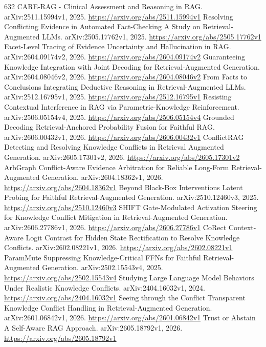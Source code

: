 \documentclass[11pt]{article}
\begin{document}
\begin{thebibliography}{632}
 CARE-RAG - Clinical Assessment and Reasoning in RAG. arXiv:2511.15994v1, 2025. \url{https://arxiv.org/abs/2511.15994v1}
 Resolving Conflicting Evidence in Automated Fact-Checking A Study on Retrieval-Augmented LLMs. arXiv:2505.17762v1, 2025. \url{https://arxiv.org/abs/2505.17762v1}
 Facet-Level Tracing of Evidence Uncertainty and Hallucination in RAG. arXiv:2604.09174v2, 2026. \url{https://arxiv.org/abs/2604.09174v2}
 Guaranteeing Knowledge Integration with Joint Decoding for Retrieval-Augmented Generation. arXiv:2604.08046v2, 2026. \url{https://arxiv.org/abs/2604.08046v2}
 From Facts to Conclusions Integrating Deductive Reasoning in Retrieval-Augmented LLMs. arXiv:2512.16795v1, 2025. \url{https://arxiv.org/abs/2512.16795v1}
 Resisting Contextual Interference in RAG via Parametric-Knowledge Reinforcement. arXiv:2506.05154v4, 2025. \url{https://arxiv.org/abs/2506.05154v4}
 Grounded Decoding Retrieval-Anchored Probability Fusion for Faithful RAG. arXiv:2606.00432v1, 2026. \url{https://arxiv.org/abs/2606.00432v1}
 ConflictRAG Detecting and Resolving Knowledge Conflicts in Retrieval Augmented Generation. arXiv:2605.17301v2, 2026. \url{https://arxiv.org/abs/2605.17301v2}
 ArbGraph Conflict-Aware Evidence Arbitration for Reliable Long-Form Retrieval-Augmented Generation. arXiv:2604.18362v1, 2026. \url{https://arxiv.org/abs/2604.18362v1}
 Beyond Black-Box Interventions Latent Probing for Faithful Retrieval-Augmented Generation. arXiv:2510.12460v3, 2025. \url{https://arxiv.org/abs/2510.12460v3}
 SHIFT Gate-Modulated Activation Steering for Knowledge Conflict Mitigation in Retrieval-Augmented Generation. arXiv:2606.27786v1, 2026. \url{https://arxiv.org/abs/2606.27786v1}
 CoRect Context-Aware Logit Contrast for Hidden State Rectification to Resolve Knowledge Conflicts. arXiv:2602.08221v1, 2026. \url{https://arxiv.org/abs/2602.08221v1}
 ParamMute Suppressing Knowledge-Critical FFNs for Faithful Retrieval-Augmented Generation. arXiv:2502.15543v4, 2025. \url{https://arxiv.org/abs/2502.15543v4}
 Studying Large Language Model Behaviors Under Realistic Knowledge Conflicts. arXiv:2404.16032v1, 2024. \url{https://arxiv.org/abs/2404.16032v1}
 Seeing through the Conflict Transparent Knowledge Conflict Handling in Retrieval-Augmented Generation. arXiv:2601.06842v1, 2026. \url{https://arxiv.org/abs/2601.06842v1}
 Trust or Abstain A Self-Aware RAG Approach. arXiv:2605.18792v1, 2026. \url{https://arxiv.org/abs/2605.18792v1}

\end{thebibliography}
\end{document}
